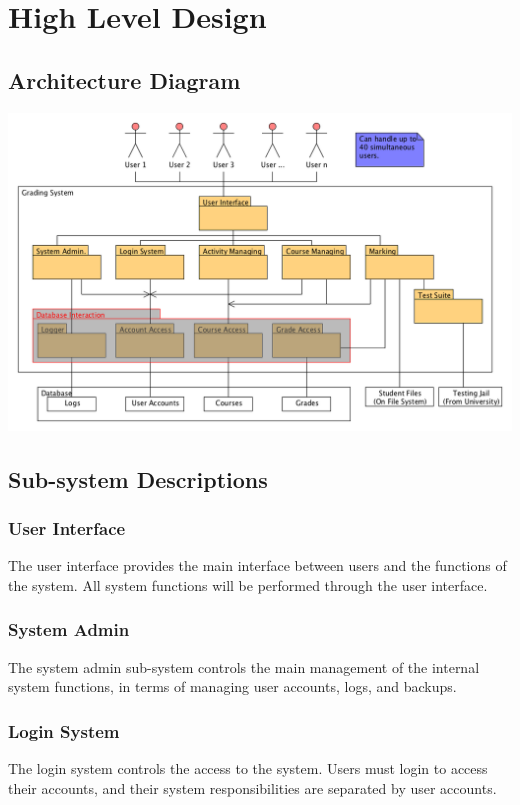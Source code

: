 \documentclass{article}
\begin{document}
\tableofcontents
\clearpage

\section{High Level Design}
\subsection{Architecture Diagram}
\centerline{\includegraphics[scale=0.55]{../images/architectureDiagram}}

\subsection{Sub-system Descriptions}
\subsubsection{User Interface}
The user interface provides the main interface between users and the functions
of the system. All system functions will be performed through the user interface.
\subsubsection{System Admin}
The system admin sub-system controls the main management of the internal
system functions, in terms of managing user accounts, logs, and backups.
\subsubsection{Login System}
The login system controls the access to the system. Users must login to access 
their accounts, and their system responsibilities are separated by user accounts.
\end{document}
